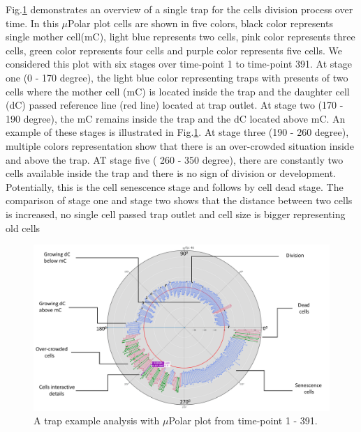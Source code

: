 \documentclass[conference]{IEEEtran}
\begin{document}
Fig.\ref{fig:explain} demonstrates an overview of a single trap for the cells division process over time. In this $\mu$Polar plot cells are shown in five colors, black color represents single mother cell(mC), light blue represents two cells, pink color represents three cells, green color represents four cells and purple color represents five cells. We considered this plot with six stages over time-point 1 to time-point 391. At stage one (0 - 170 degree), the light blue color representing traps with presents of two cells where the mother cell (mC) is located inside the trap and the daughter cell (dC) passed reference line (red line) located at trap outlet. At stage two (170 - 190 degree), the mC remains inside the trap and the dC located above mC.  An example of these stages is illustrated in Fig.\ref{fig:explain}. At stage three (190 - 260 degree), multiple colors representation show that there is an over-crowded situation inside and above the trap. AT stage five ( 260 - 350 degree), there are constantly two cells available inside the trap and there is no sign of division or development. Potentially, this is the cell senescence stage and follows by cell dead stage. The comparison of stage one and stage two shows that the distance between two cells is increased, no single cell passed trap outlet and cell size is bigger representing old cells    


\begin{figure}
\centering
\includegraphics[width=\textwidth,height=10 cm]{Patterns/explain.pdf}
\caption{A trap example analysis with $\mu$Polar plot from time-point 1 - 391.}
\label{fig:explain}
\end{figure}
\end{document}
